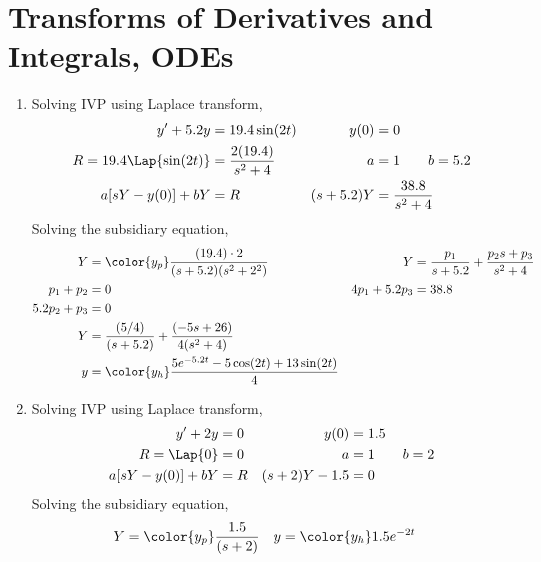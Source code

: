 \section{Transforms of Derivatives and Integrals, ODEs}
\begin{enumerate}
    \item Solving IVP using Laplace transform,
          \begin{align}
              y' + 5.2y                & = 19.4\sin(2t)            &
              y(0)                     & = 0                         \\
              R = 19.4\Lap\{\sin(2t)\} & = \frac{2(19.4)}{s^2 + 4} &
              a                        & = 1 \qquad b = 5.2          \\
              a[sY - y(0)] + bY        & = R                       &
              (s+5.2)Y                 & = \frac{38.8}{s^2+4}
          \end{align}
          Solving the subsidiary equation,
          \begin{align}
              Y             & = \color{y_p}\frac{(19.4)\cdot 2}{(s+5.2)(s^2 + 2^2)} &
              Y             & = \frac{p_1}{s+5.2} + \frac{p_2 s + p_3}{s^2+4}         \\
              p_1 + p_2     & = 0                                                   &
              4p_1 + 5.2p_3 & = 38.8                                                  \\
              5.2p_2 + p_3  & = 0                                                   & \\
              Y             & = \frac{(5/4)}{(s+5.2)} + \frac{(-5s+26)}{4(s^2+4)}     \\
              y             & = \color{y_h}\frac{5e^{-5.2t} - 5\cos(2t)
                  + 13\sin(2t)}{4}
          \end{align}

    \item Solving IVP using Laplace transform,
          \begin{align}
              y' + 2y           & = 0              &
              y(0)              & = 1.5              \\
              R = \Lap\{0\}     & = 0              &
              a                 & = 1 \qquad b = 2   \\
              a[sY - y(0)] + bY & = R              &
              (s+2)Y - 1.5      & = 0
          \end{align}
          Solving the subsidiary equation,
          \begin{align}
              Y & = \color{y_p}\frac{1.5}{(s+2)} &
              y & = \color{y_h}1.5e^{-2t}
          \end{align}


\end{enumerate}
